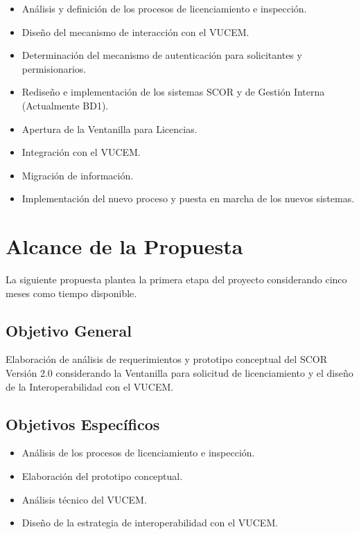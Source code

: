 \documentclass[10pt]{book}
\begin{document}
\begin{itemize}
	\item Análisis y definición de los procesos de licenciamiento e inspección.
	\item Diseño del mecanismo de interacción con el VUCEM.
	\item Determinación del mecanismo de autenticación para solicitantes y permisionarios.
	\item Rediseño e implementación de los sistemas SCOR y de Gestión Interna (Actualmente BD1).
	\item Apertura de la Ventanilla para Licencias.
	\item Integración con el VUCEM.
	\item Migración de información.
	\item Implementación del nuevo proceso y puesta en marcha de los nuevos sistemas.
\end{itemize}

\chapter{Alcance de la Propuesta}

	La siguiente propuesta plantea la primera etapa del proyecto considerando cinco meses como tiempo disponible.

\section{Objetivo General}

	Elaboración de análisis de requerimientos y prototipo conceptual del SCOR Versión 2.0 considerando la Ventanilla para solicitud de licenciamiento y el diseño de la Interoperabilidad con el VUCEM.

\section{Objetivos Específicos}

\begin{itemize}
	\item Análisis de los procesos de licenciamiento e inspección.
	\item Elaboración del prototipo conceptual.
	\item Análisis técnico del VUCEM.
	\item Diseño de la estrategia de interoperabilidad con el VUCEM.
\end{itemize}
\end{document}
